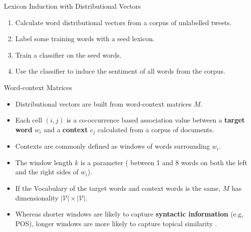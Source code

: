 \begin{frame}{Lexicon Induction with Distributional Vectors}
\begin{scriptsize}
\begin{enumerate}
\item Calculate word distributional vectors from a corpus of unlabelled tweets.
\item Label some training words with a seed lexicon.
\item Train a classifier on the seed words.
\item Use the classifier to induce the sentiment of all words from the corpus.
\end{enumerate}
\end{scriptsize}
\end{frame}

\begin{frame}{Word-context Matrices}
\begin{scriptsize}
\begin{itemize}
\item Distributional vectors are built from word-context matrices $M$. 
\item Each cell $(i,j)$ is a co-occurrence based association value between a \textbf{target word} $w_i$ and a \textbf{context} $c_j$ calculated  from a corpus of documents.
\item Contexts are commonly defined as windows of words surrounding $w_i$.
\item The window length $k$ is a parameter ( between 1 and 8 words on both the left and the right sides of $w_i$).
\item If the Vocabulary of the target words and context words is the same, $M$ has dimensionality $|\mathcal{V}| \times |\mathcal{V}|$.
\item Whereas shorter windows are likely to capture \textbf{syntactic information} (e.g, POS), longer windows are more likely to capture topical similarity \cite{goldberg2016primer, JurafskyBook}.
\end{itemize}

\end{scriptsize}
\end{frame}



